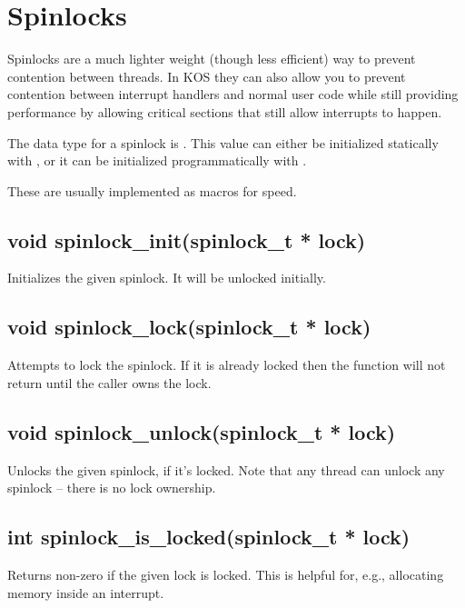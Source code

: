 \documentclass[english]{report}
\begin{document}

\section{Spinlocks}

Spinlocks are a much lighter weight (though less efficient) way to
prevent contention between threads. In KOS they can also allow you
to prevent contention between interrupt handlers and normal user code
while still providing performance by allowing critical sections that
still allow interrupts to happen.

The data type for a spinlock is . This value can either
be initialized statically with , or it
can be initialized programmatically with .

These are usually implemented as macros for speed.

\subsection{void spinlock\_init(spinlock\_t * lock)}

Initializes the given spinlock. It will be unlocked initially.

\subsection{void spinlock\_lock(spinlock\_t * lock)}

Attempts to lock the spinlock. If it is already locked then the function
will not return until the caller owns the lock.

\subsection{void spinlock\_unlock(spinlock\_t * lock)}

Unlocks the given spinlock, if it's locked. Note that any thread
can unlock any spinlock -- there is no lock ownership.

\subsection{int spinlock\_is\_locked(spinlock\_t * lock)}

Returns non-zero if the given lock is locked. This is helpful for,
e.g., allocating memory inside an interrupt.

\end{document}
